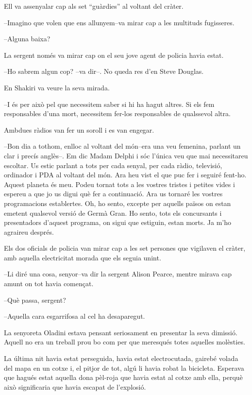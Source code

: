 Ell va assenyalar cap als set ``guàrdies'' al voltant del cràter.

--Imagino que volen que ens allunyem--va mirar cap a les multituds
fugisseres.

--Alguna baixa?

La sergent només va mirar cap on el seu jove agent de policia havia
estat.

--Ho sabrem algun cop? --va dir--. No queda res d'en Steve Douglas.

En Shakiri va veure la seva mirada.

--I és per això pel que necessitem saber si hi ha hagut altres. Si els
fem responsables d'una mort, necessitem fer-los responsables de
qualssevol altra.

Ambdues ràdios van fer un soroll i es van engegar.

--Bon dia a tothom, enlloc al voltant del món--era una veu femenina,
parlant un clar i precís anglès--. Em dic Madam Delphi i sóc l'única veu
que mai necessitareu escoltar. Us estic parlant a tots per cada senyal,
per cada ràdio, televisió, ordinador i PDA al voltant del món. Ara heu
vist el que puc fer i seguiré fent-ho. Aquest planeta és meu. Podeu
tornat tots a les vostres tristes i petites vides i espereu a que jo us
digui què fer a continuació. Ara us tornaré les vostres programacions
establertes. Oh, ho sento, excepte per aquells països on estan emetent
qualsevol versió de Germà Gran. Ho sento, tots els concursants i
presentadors d'aquest programa, on sigui que estiguin, estan morts. Ja
m'ho agraireu després.

Els dos oficials de policia van mirar cap a les set persones que
vigilaven el cràter, amb aquella electricitat morada que els seguia
unint.

--Li diré una cosa, senyor--va dir la sergent Alison Pearce, mentre
mirava cap amunt on tot havia començat.

--Què passa, sergent?

--Aquella cara esgarrifosa al cel ha desaparegut.

La senyoreta Oladini estava pensant seriosament en presentar la seva
dimissió. Aquell no era un treball prou bo com per que meresqués totes
aquelles molèsties.

La última nit havia estat perseguida, havia estat electrocutada, gairebé
volada del mapa en un cotxe i, el pitjor de tot, algú li havia robat la
bicicleta. Esperava que hagués estat aquella dona pèl-roja que havia
estat al cotxe amb ella, perquè això significaria que havia escapat de
l'explosió.

